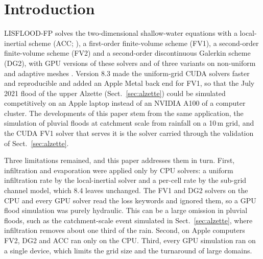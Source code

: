 \documentclass[draft,linenumbers]{agujournal2025}
\begin{document}
\section{Introduction}

LISFLOOD-FP solves the two-dimensional shallow-water equations with a
local-inertial scheme (ACC; ), a first-order
finite-volume scheme (FV1), a second-order finite-volume scheme (FV2) and a
second-order discontinuous Galerkin scheme (DG2), with GPU versions of these
solvers and of three variants on non-uniform and adaptive meshes
\cite{Shaw2021,Sharifian2023,Chowdhury2025,LISFLOODFP82zenodo}.
Version 8.3 made the uniform-grid CUDA solvers faster and reproducible and
added an Apple Metal back end for FV1, so that
the July 2021 flood of the upper Alzette (Sect.~\ref{sec:alzette}) could be
simulated competitively on an Apple laptop instead of an NVIDIA A100 of a computer cluster.
The developments of this paper stem from the same application, the
simulation of pluvial floods at catchment scale from rainfall on a 10\,m
grid, and the CUDA FV1 solver that serves it is the solver carried through
the validation of Sect.~\ref{sec:alzette}.

Three limitations remained, and this paper addresses them in turn. First,
infiltration and evaporation were applied only by CPU solvers: a uniform
infiltration rate by the local-inertial solver and a per-cell rate by the
sub-grid channel model, which 8.4 leaves unchanged. The FV1 and DG2
solvers on the CPU and every GPU solver read the loss keywords and ignored
them, so a GPU flood simulation was purely hydraulic. This can be a large
omission in pluvial floods, such as the catchment-scale event simulated in
Sect.~\ref{sec:alzette}, where infiltration removes about one third of the
rain.
Second, on Apple computers FV2, DG2 and ACC ran only on the CPU. Third,
every GPU simulation ran on a single device, which limits the grid size and
the turnaround of large domains.
\end{document}
